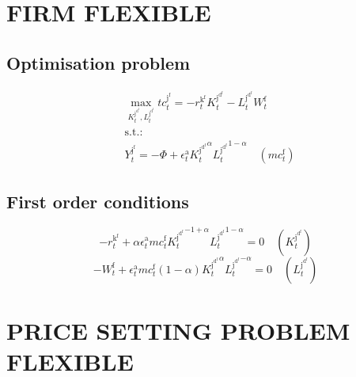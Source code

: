 \section{FIRM FLEXIBLE}

\subsection{Optimisation problem}

\begin{align}
&\max_{K^{\mathrm{j}^{\mathrm{d}^{\mathrm{f}}}}_{t}, L^{\mathrm{j}^{\mathrm{d}^{\mathrm{f}}}}_{t}
} {t\!c}^{\mathrm{j}^{\mathrm{f}}}_{t} = -{r^{\mathrm{k}^{\mathrm{f}}}_{t}} {K^{\mathrm{j}^{\mathrm{d}^{\mathrm{f}}}}_{t}} - {L^{\mathrm{j}^{\mathrm{d}^{\mathrm{f}}}}_{t}} {W^{\mathrm{f}}_{t}}\\
&\mathrm{s.t.:}\nonumber\\
& Y^{\mathrm{j}^{\mathrm{f}}}_{t} = -\Phi + {\epsilon^{\mathrm{a}}_{t}} {{K^{\mathrm{j}^{\mathrm{d}^{\mathrm{f}}}}_{t}}^{\alpha}} {{L^{\mathrm{j}^{\mathrm{d}^{\mathrm{f}}}}_{t}}^{1 - \alpha}} \quad \left({m\!c}^{\mathrm{f}}_{t}\right)
\end{align}


\subsection{First order conditions}

\begin{equation}
-r^{\mathrm{k}^{\mathrm{f}}}_{t} + {\alpha} {\epsilon^{\mathrm{a}}_{t}} {{m\!c}^{\mathrm{f}}_{t}} {{K^{\mathrm{j}^{\mathrm{d}^{\mathrm{f}}}}_{t}}^{-1 + \alpha}} {{L^{\mathrm{j}^{\mathrm{d}^{\mathrm{f}}}}_{t}}^{1 - \alpha}} = 0
 \quad \left(K^{\mathrm{j}^{\mathrm{d}^{\mathrm{f}}}}_{t}\right)
\end{equation}
\begin{equation}
-W^{\mathrm{f}}_{t} + {\epsilon^{\mathrm{a}}_{t}} {{m\!c}^{\mathrm{f}}_{t}} \left(1 - \alpha\right) {{K^{\mathrm{j}^{\mathrm{d}^{\mathrm{f}}}}_{t}}^{\alpha}} {{L^{\mathrm{j}^{\mathrm{d}^{\mathrm{f}}}}_{t}}^{-\alpha}} = 0
 \quad \left(L^{\mathrm{j}^{\mathrm{d}^{\mathrm{f}}}}_{t}\right)
\end{equation}




\section{PRICE SETTING PROBLEM FLEXIBLE}

